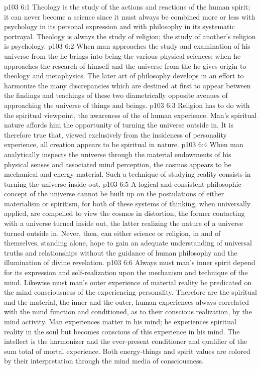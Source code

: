 \vs p103 6:1 Theology is the study of the actions and reactions of the human spirit; it can never become a science since it must always be combined more or less with psychology in its personal expression and with philosophy in its systematic portrayal. Theology is always the study of  religion; the study of another’s religion is psychology.
\vs p103 6:2 \pc When man approaches the study and examination of his universe from the  he brings into being the various physical sciences; when he approaches the research of himself and the universe from the  he gives origin to theology and metaphysics. The later art of philosophy develops in an effort to harmonize the many discrepancies which are destined at first to appear between the findings and teachings of these two diametrically opposite avenues of approaching the universe of things and beings.
\vs p103 6:3 Religion has to do with the spiritual viewpoint, the awareness of the  of human experience. Man’s spiritual nature affords him the opportunity of turning the universe outside in. It is therefore true that, viewed exclusively from the insideness of personality experience, all creation appears to be spiritual in nature.
\vs p103 6:4 When man analytically inspects the universe through the material endowments of his physical senses and associated mind perception, the cosmos appears to be mechanical and energy\hyp{}material. Such a technique of studying reality consists in turning the universe inside out.
\vs p103 6:5 \pc A logical and consistent philosophic concept of the universe cannot be built up on the postulations of either materialism or spiritism, for both of these systems of thinking, when universally applied, are compelled to view the cosmos in distortion, the former contacting with a universe turned inside out, the latter realizing the nature of a universe turned outside in. Never, then, can either science or religion, in and of themselves, standing alone, hope to gain an adequate understanding of universal truths and relationships without the guidance of human philosophy and the illumination of divine revelation.
\vs p103 6:6 Always must man’s inner spirit depend for its expression and self\hyp{}realization upon the mechanism and technique of the mind. Likewise must man’s outer experience of material reality be predicated on the mind consciousness of the experiencing personality. Therefore are the spiritual and the material, the inner and the outer, human experiences always correlated with the mind function and conditioned, as to their conscious realization, by the mind activity. Man experiences matter in his mind; he experiences spiritual reality in the soul but becomes conscious of this experience in his mind. The intellect is the harmonizer and the ever\hyp{}present conditioner and qualifier of the sum total of mortal experience. Both energy\hyp{}things and spirit values are colored by their interpretation through the mind media of consciousness.
